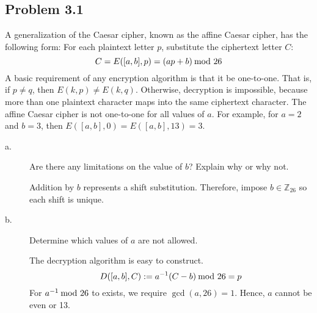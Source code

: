 \documentclass[../hw_sols.tex]{subfiles}
\begin{document}

\subsection*{Problem 3.1}

A generalization of the Caesar cipher, known as the affine Caesar cipher, has 
the following form: For each plaintext letter $p$, substitute the ciphertext 
letter $C$:
	\[ C = E([a,b], p) = (ap + b) \tmod{26} \]
A basic requirement of any encryption algorithm is that it be one-to-one. 
That is, if $p \neq q$, then $E(k,p) \neq E(k,q)$. Otherwise, decryption is 
impossible, because more than one plaintext character maps into the same 
ciphertext character. The affine Caesar cipher is not one-to-one for all 
values of $a$. For example, for $a = 2$ and $b = 3$, then \newline
$E([a,b], 0) = E([a,b], 13) = 3$.

\begin{description}

\item[a.] Are there any limitations on the value of $b$? Explain why or why 
not.

\begin{solution}
Addition by $b$ represents a shift substitution. Therefore, impose 
$b \in \mathbb{Z}_{26}$ so each shift is unique.
\end{solution}

\item[b.] Determine which values of $a$ are not allowed.

\begin{solution}
The decryption algorithm is easy to construct.
	\[ D([a,b],C) := a^{-1}(C-b) \tmod{26} = p \]
For $a^{-1} \tmod{26}$ to exists, we require $\gcd(a,26) = 1$. Hence, $a$ 
cannot be even or 13.
\end{solution}

\end{description}


\newpage


\end{document}
